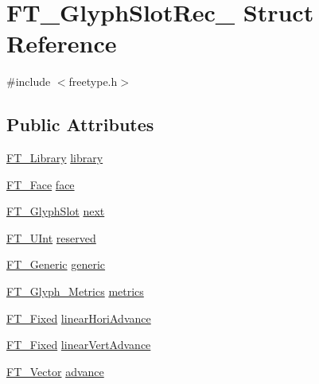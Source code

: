 \hypertarget{struct_f_t___glyph_slot_rec__}{\section{F\-T\-\_\-\-Glyph\-Slot\-Rec\-\_\- Struct Reference}
\label{struct_f_t___glyph_slot_rec__}
}


{\ttfamily \#include $<$freetype.\-h$>$}

\subsection*{Public Attributes}
\begin{DoxyCompactItemize}
\item 
\hyperlink{freetype_8h_a92857f8bf079b7b9ef5d3ce74cf89ef5}{F\-T\-\_\-\-Library} \hyperlink{struct_f_t___glyph_slot_rec___a5415bcbf70efb3aae7a6b77040e21e91}{library}
\item 
\hyperlink{freetype_8h_a7eba045ee20968354fa1bff0f69740fa}{F\-T\-\_\-\-Face} \hyperlink{struct_f_t___glyph_slot_rec___a0f5dbaf7d539bf2d92ecdff740342b04}{face}
\item 
\hyperlink{freetype_8h_a768daa0d9c3fa499e6c37034ee9f2ca3}{F\-T\-\_\-\-Glyph\-Slot} \hyperlink{struct_f_t___glyph_slot_rec___af339309df5ebe70dfa62a9f4f8838440}{next}
\item 
\hyperlink{fttypes_8h_abcb8db4dbf35d2b55a9e8c7b0926dc52}{F\-T\-\_\-\-U\-Int} \hyperlink{struct_f_t___glyph_slot_rec___ae829996584939557dfe46c4e4f2b28a8}{reserved}
\item 
\hyperlink{fttypes_8h_ae15e8550dd7d863328686aadaead5c77}{F\-T\-\_\-\-Generic} \hyperlink{struct_f_t___glyph_slot_rec___ac2d04848997fba660e17bc00760ef14f}{generic}
\item 
\hyperlink{freetype_8h_aba844698c24c1c12727c60a6fc0a9b3d}{F\-T\-\_\-\-Glyph\-\_\-\-Metrics} \hyperlink{struct_f_t___glyph_slot_rec___abe1ba307281c06a232f50e34c061ce7b}{metrics}
\item 
\hyperlink{fttypes_8h_a5f5a679cc09f758efdd0d1c5feed3c3d}{F\-T\-\_\-\-Fixed} \hyperlink{struct_f_t___glyph_slot_rec___a9d0ba6b09729d4f009ef380e267607c3}{linear\-Hori\-Advance}
\item 
\hyperlink{fttypes_8h_a5f5a679cc09f758efdd0d1c5feed3c3d}{F\-T\-\_\-\-Fixed} \hyperlink{struct_f_t___glyph_slot_rec___abc10f58c3d859e46694515956aa4a1e8}{linear\-Vert\-Advance}
\item 
\hyperlink{ftimage_8h_ab158b5a7e422acb1968af95db786d018}{F\-T\-\_\-\-Vector} \hyperlink{struct_f_t___glyph_slot_rec___a09779d1a4781ea029382e92c01048c6a}{advance}

\end{DoxyCompactItemize}
